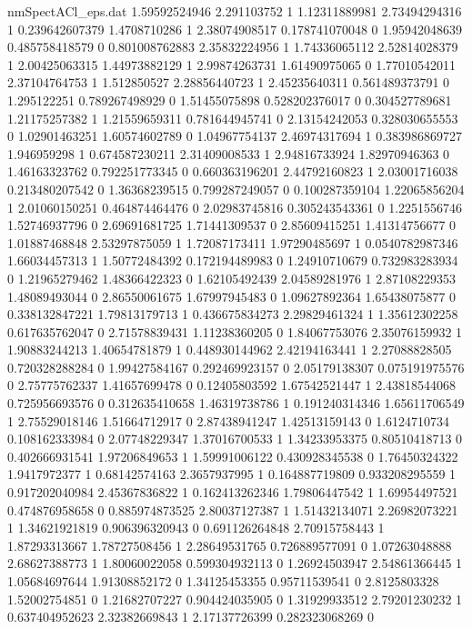 \begin{filecontents}{nmSpectACl_eps.dat}
1.59592524946 2.291103752 1
1.12311889981 2.73494294316 1
0.239642607379 1.4708710286 1
2.38074908517 0.178741070048 0
1.95942048639 0.485758418579 0
0.801008762883 2.35832224956 1
1.74336065112 2.52814028379 1
2.00425063315 1.44973882129 1
2.99874263731 1.61490975065 0
1.77010542011 2.37104764753 1
1.512850527 2.28856440723 1
2.45235640311 0.561489373791 0
1.295122251 0.789267498929 0
1.51455075898 0.528202376017 0
0.304527789681 1.21175257382 1
1.21559659311 0.781644945741 0
2.13154242053 0.328030655553 0
1.02901463251 1.60574602789 0
1.04967754137 2.46974317694 1
0.383986869727 1.946959298 1
0.674587230211 2.31409008533 1
2.94816733924 1.82970946363 0
1.46163323762 0.792251773345 0
0.660363196201 2.44792160823 1
2.03001716038 0.213480207542 0
1.36368239515 0.799287249057 0
0.100287359104 1.22065856204 1
2.01060150251 0.464874464476 0
2.02983745816 0.305243543361 0
1.2251556746 1.52746937796 0
2.69691681725 1.71441309537 0
2.85609415251 1.41314756677 0
1.01887468848 2.53297875059 1
1.72087173411 1.97290485697 1
0.0540782987346 1.66034457313 1
1.50772484392 0.172194489983 0
1.24910710679 0.732983283934 0
1.21965279462 1.48366422323 0
1.62105492439 2.04589281976 1
2.87108229353 1.48089493044 0
2.86550061675 1.67997945483 0
1.09627892364 1.65438075877 0
0.338132847221 1.79813179713 1
0.436675834273 2.29829461324 1
1.35612302258 0.617635762047 0
2.71578839431 1.11238360205 0
1.84067753076 2.35076159932 1
1.90883244213 1.40654781879 1
0.448930144962 2.42194163441 1
2.27088828505 0.720328288284 0
1.99427584167 0.292469923157 0
2.05179138307 0.075191975576 0
2.75775762337 1.41657699478 0
0.12405803592 1.67542521447 1
2.43818544068 0.725956693576 0
0.312635410658 1.46319738786 1
0.191240314346 1.65611706549 1
2.75529018146 1.51664712917 0
2.87438941247 1.42513159143 0
1.6124710734 0.108162333984 0
2.07748229347 1.37016700533 1
1.34233953375 0.80510418713 0
0.402666931541 1.97206849653 1
1.59991006122 0.430928345538 0
1.76450324322 1.9417972377 1
0.68142574163 2.3657937995 1
0.164887719809 0.933208295559 1
0.917202040984 2.45367836822 1
0.162413262346 1.79806447542 1
1.69954497521 0.474876958658 0
0.885974873525 2.80037127387 1
1.51432134071 2.26982073221 1
1.34621921819 0.906396320943 0
0.691126264848 2.70915758443 1
1.87293313667 1.78727508456 1
2.28649531765 0.726889577091 0
1.07263048888 2.68627388773 1
1.80060022058 0.599304932113 0
1.26924503947 2.54861366445 1
1.05684697644 1.91308852172 0
1.34125453355 0.95711539541 0
2.8125803328 1.52002754851 0
1.21682707227 0.904424035905 0
1.31929933512 2.79201230232 1
0.637404952623 2.32382669843 1
2.17137726399 0.282323068269 0

\end{filecontents}
